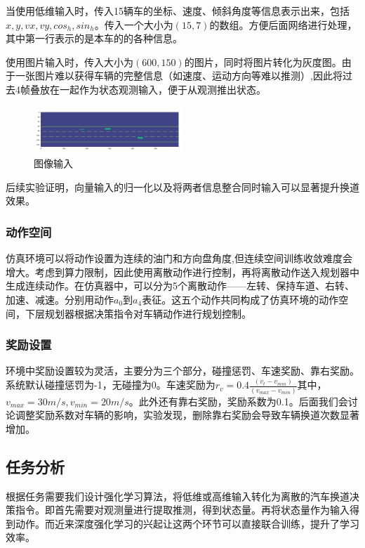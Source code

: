 \documentclass[letterpaper, 10 pt, conference]{ieeeconf}  %
\begin{document}
当使用低维输入时，传入15辆车的坐标、速度、倾斜角度等信息表示出来，包括$x,y,vx,vy,cos_h,sin_h$。传入一个大小为$(15,7)$的数组。方便后面网络进行处理，其中第一行表示的是本车的的各种信息。

使用图片输入时，传入大小为$(600,150)$的图片，同时将图片转化为灰度图。由于一张图片难以获得车辆的完整信息（如速度、运动方向等难以推测）,因此将过去4帧叠放在一起作为状态观测输入，便于从观测推出状态。

\begin{figure}[htb] %
    \centering %
    \includegraphics[width=0.5\textwidth]{fig/1.png} %
    \caption{图像输入} %
    \label{Fig.main1} %
\end{figure}

后续实验证明，向量输入的归一化以及将两者信息整合同时输入可以显著提升换道效果。

\subsubsection{动作空间}
仿真环境可以将动作设置为连续的油门和方向盘角度,但连续空间训练收敛难度会增大。考虑到算力限制，因此使用离散动作进行控制，再将离散动作送入规划器中生成连续动作。在仿真器中，可以分为5个离散动作——左转、保持车道、右转、加速、减速。分别用动作$a_0$到$a_4$表征。这五个动作共同构成了仿真环境的动作空间，下层规划器根据决策指令对车辆动作进行规划控制。

\subsubsection{奖励设置}
环境中奖励设置较为灵活，主要分为三个部分，碰撞惩罚、车速奖励、靠右奖励。系统默认碰撞惩罚为-1，无碰撞为0。车速奖励为$r_v = 0.4\frac{(v_t-v_{min})}{(v_{max}-v_{min})}$其中，$v_{max} = 30m/s,v_{min}=20m/s$。此外还有靠右奖励，奖励系数为0.1。后面我们会讨论调整奖励系数对车辆的影响，实验发现，删除靠右奖励会导致车辆换道次数显著增加。

\subsection{任务分析}
根据任务需要我们设计强化学习算法，将低维或高维输入转化为离散的汽车换道决策指令。即首先需要对观测量进行提取推测，得到状态量。再将状态量作为输入得到动作。而近来深度强化学习的兴起让这两个环节可以直接联合训练，提升了学习效率。
\end{document}
